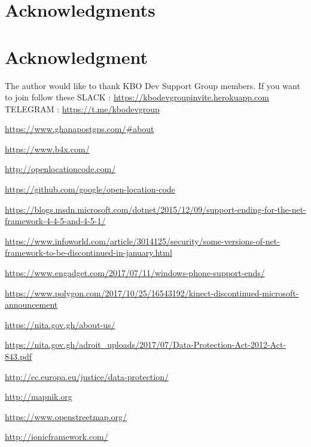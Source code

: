 \documentclass[conference,compsoc]{IEEEtran}
\begin{document}
\newpage
\ifCLASSOPTIONcompsoc
  \section*{Acknowledgments}
\else
  \section*{Acknowledgment}
\fi


The author would like to thank KBO Dev Support Group members.
If you want to join follow these \newline
SLACK : \url{https://kbodevgroupinvite.herokuapp.com}\newline
TELEGRAM : \url{https://t.me/kbodevgroup}


\newpage
{}
\IEEEtriggercmd{\enlargethispage{-5in}}


%
\begin{thebibliography}{0}

\url{https://www.ghanapostgps.com/#about}

\url{https://www.b4x.com/}

\url{http://openlocationcode.com/}

\url{https://github.com/google/open-location-code}

\url{https://blogs.msdn.microsoft.com/dotnet/2015/12/09/support-ending-for-the-net-framework-4-4-5-and-4-5-1/}

\url{https://www.infoworld.com/article/3014125/security/some-versions-of-net-framework-to-be-discontinued-in-january.html}

\url{https://www.engadget.com/2017/07/11/windows-phone-support-ends/}

\url{https://www.polygon.com/2017/10/25/16543192/kinect-discontinued-microsoft-announcement}

\url{https://nita.gov.gh/about-us/}

\url{https://nita.gov.gh/adroit_uploads/2017/07/Data-Protection-Act-2012-Act-843.pdf}

\url{http://ec.europa.eu/justice/data-protection/}

\url{http://mapnik.org}

\url{https://www.openstreetmap.org/}

\url{http://ionicframework.com/}

\end{thebibliography}


\end{document}
